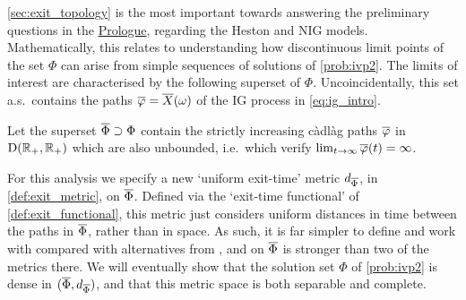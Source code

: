 \autoref{sec:exit_topology} is the most important towards answering the preliminary questions in the \hyperlink{prologue}{Prologue}, regarding the Heston and NIG models. Mathematically, this relates to understanding how discontinuous limit points of the set $\Phi$ can arise from simple sequences of solutions of \autoref{prob:ivp2}. The limits of interest are characterised by the following superset of $\Phi$. Uncoincidentally, this set a.s.~contains the paths $\overline{\varphi}={\overline{X}}(\omega)$ of the IG process in \autoref{eq:ig_intro}.
\begin{definition}\label{def:setE}
    Let the superset $\overline{\Phi}\supset\Phi$ contain the strictly increasing c\`adl\`ag paths $\overline{\varphi}$ in $\mathrm{D}(\mathbb{R}_+,\mathbb{R}_+)$ which are also unbounded, i.e.~which verify $\lim_{t\to\infty}\overline{\varphi}(t)=\infty$.
\end{definition}
For this analysis we specify a new `uniform exit-time' metric $d_{\overline{\Phi}}$, in \autoref{def:exit_metric}, on $\overline{\Phi}$. Defined via the `exit-time functional' of \autoref{def:exit_functional}, this metric just considers uniform distances in time between the paths in $\overline{\Phi}$, rather than in space. As such, it is far simpler to define and work with compared with alternatives from \cite{skorokhod_1956}, and on $\overline{\Phi}$ is stronger than two of the metrics there. We will eventually show that the solution set $\Phi$ of \autoref{prob:ivp2} is dense in $(\overline{\Phi},d_{\overline{\Phi}})$, and that this metric space is both separable and complete.

